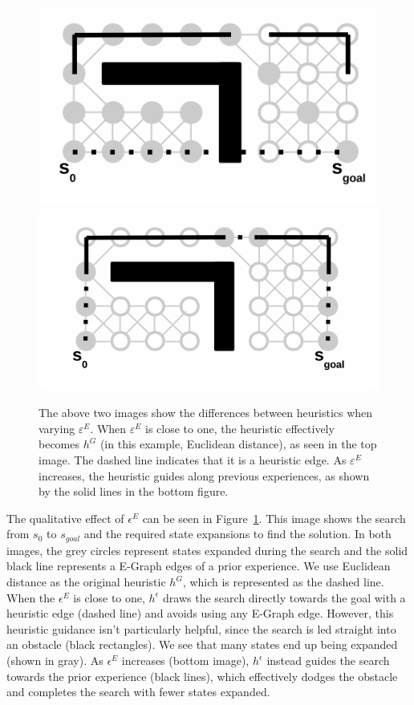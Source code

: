 \documentclass[letterpaper, 10 pt, conference]{ieeeconf}  %
\newcommand{\figref}[1]{Figure~\ref{fig:#1}}
\newcommand{\figlab}[1]{\label{fig:#1}}
\newcommand{\eeg}{\varepsilon^{E}}
\begin{document}
\begin{figure}
\centering
\figlab{heur_1}\includegraphics[width=0.8\columnwidth]{eps1.png}
\figlab{heur_inf}\includegraphics[width=0.9\columnwidth]{eps_inf.png}
\caption{The above two images show the differences between heuristics when varying
    $\eeg$. When $\eeg$ is close to one, the heuristic effectively becomes $h^G$
    (in this example, Euclidean distance), as seen in the top image. The dashed
    line indicates that it is a heuristic edge. As $\eeg$ increases, the
    heuristic guides along previous experiences, as shown by the solid lines in
    the bottom figure.
}
\vspace{-4mm}
\figlab{heur}
\end{figure}

The qualitative effect of $\epsilon^E$ can be seen in \figref{heur}.  This image
shows the search from $s_0$ to $s_{goal}$ and the required state expansions to
find the solution. In both images, the grey circles represent states expanded
during the search and the solid black line represents a E-Graph edges of a prior
experience. We use Euclidean distance as the original heuristic $h^G$, which is
represented as the dashed line. When the $\epsilon^E$ is close to one,
$h^\epsilon$ draws the search directly towards the goal with a heuristic edge
(dashed line) and avoids using any E-Graph edge. However, this heuristic
guidance isn't particularly helpful, since the search is led straight into an
obstacle (black rectangles). We see that many states end up being expanded
(shown in gray). As
$\epsilon^E$ increases (bottom image), $h^\epsilon$ instead guides the search
towards the prior experience (black lines), which effectively dodges the
obstacle and completes the search with fewer states expanded.
\end{document}
